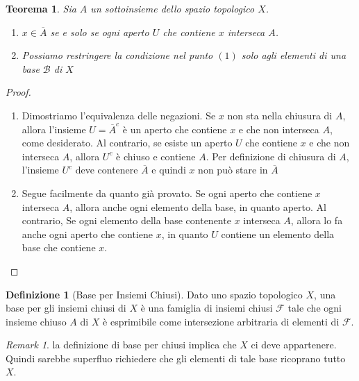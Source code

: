 \documentclass[10pt,a4paper]{article}
\theoremstyle{definition}
\newtheorem{defi}{Definizione}
\theoremstyle{plain}
\newtheorem{teo}{Teorema}
\theoremstyle{remark}
\newtheorem{rem}{Remark}
\theoremstyle{remark}
\newcommand{\B}{\mathcal{B}}
\newcommand{\F}{\mathcal{F}}
\begin{document}
\begin{teo} Sia $A$ un sottoinsieme dello spazio topologico $X$.
\begin{enumerate}
\item $x \in \overline{A}$ se e solo se ogni aperto $U$ che contiene $x$
interseca $A$.
\item Possiamo restringere la condizione nel punto $(1)$ solo agli elementi di
una base $\B$ di $X$
\end{enumerate}
\end{teo}
\begin{proof}
\begin{enumerate}
\item Dimostriamo l'equivalenza delle negazioni. Se $x$ non sta nella chiusura
di $A$, allora l'insieme $U= \overline{A}^c$ è un aperto che contiene $x$ e che
non interseca $A$, come desiderato. Al contrario, se esiste un aperto $U$ che
contiene $x$ e che non interseca $A$, allora $U^c$ è chiuso e contiene $A$. Per
definizione di chiusura di $A$, l'insieme $U^c$ deve contenere $\overline{A}$ e
quindi $x$ non può stare in $\overline{A}$
\item Segue facilmente da quanto già provato. Se ogni aperto che contiene $x$
interseca $A$, allora anche ogni elemento della base, in quanto aperto. Al
contrario, Se ogni elemento della base contenente $x$ interseca $A$, allora lo
fa anche ogni aperto che contiene $x$, in quanto $U$ contiene un elemento della
base che contiene $x$.
\end{enumerate}
\end{proof}

\begin{defi}[Base per Insiemi Chiusi] Dato uno spazio topologico $X$, una base
per gli insiemi chiusi di $X$ è una famiglia di insiemi chiusi $\F$ tale che
ogni insieme chiuso $A$ di $X$ è esprimibile come intersezione arbitraria di
elementi di $\F$.
\end{defi}

\begin{rem} la definizione di base per chiusi implica che $X$ ci deve
appartenere. Quindi sarebbe superfluo richiedere che gli elementi di tale base
ricoprano tutto $X$.
\end{rem}
\end{document}
